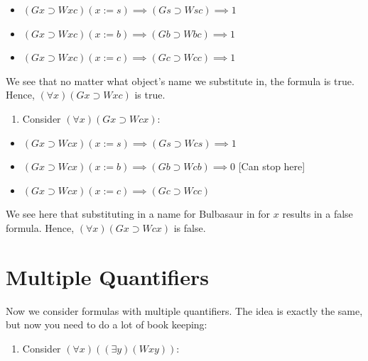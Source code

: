 \documentclass[
]{book}
\providecommand{\tightlist}{%
  \setlength{\itemsep}{0pt}\setlength{\parskip}{0pt}}
\begin{document}
\begin{itemize}
\tightlist
\item
  \((Gx \supset Wxc)(x:= s) \implies (Gs \supset Wsc) \implies 1\)
\item
  \((Gx \supset Wxc)(x:= b) \implies (Gb \supset Wbc) \implies 1\)
\item
  \((Gx \supset Wxc)(x:= c) \implies (Gc \supset Wcc) \implies 1\)
\end{itemize}

We see that no matter what object's name we substitute in, the formula is true. Hence, \((\forall x)(Gx \supset Wxc)\) is true.

\begin{enumerate}
\def\labelenumi{\arabic{enumi}.}
\setcounter{enumi}{3}
\tightlist
\item
  Consider \((\forall x)(Gx \supset Wcx)\):
\end{enumerate}

\begin{itemize}
\tightlist
\item
  \((Gx \supset Wcx)(x:= s) \implies (Gs \supset Wcs) \implies 1\)
\item
  \((Gx \supset Wcx)(x:= b) \implies (Gb \supset Wcb) \implies 0\) {[}Can stop here{]}
\item
  \((Gx \supset Wcx)(x:= c) \implies (Gc \supset Wcc)\)
\end{itemize}

We see here that substituting in a name for Bulbasaur in for \(x\) results in a false formula. Hence, \((\forall x) (Gx \supset Wcx)\) is false.

\hypertarget{multiple-quantifiers}{%
\section{Multiple Quantifiers}\label{multiple-quantifiers}}

Now we consider formulas with multiple quantifiers. The idea is exactly the same, but now you need to do a lot of book keeping:

\begin{enumerate}
\def\labelenumi{\arabic{enumi}.}
\tightlist
\item
  Consider \((\forall x)((\exists y)(Wxy))\):
\end{enumerate}
\end{document}
